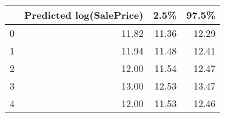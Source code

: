 \begin{tabular}{lrrr}
\toprule
{} &  Predicted log(SalePrice) &  2.5\% &  97.5\% \\
\midrule
0 &                     11.82 & 11.36 &  12.29 \\
1 &                     11.94 & 11.48 &  12.41 \\
2 &                     12.00 & 11.54 &  12.47 \\
3 &                     13.00 & 12.53 &  13.47 \\
4 &                     12.00 & 11.53 &  12.46 \\
\bottomrule
\end{tabular}
